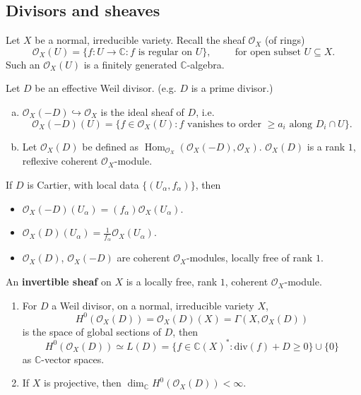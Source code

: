 \documentclass[a4paper,12pt]{amsart}
\newcommand{\CC}{\mathbb{C}}
\newcommand{\OO}{\ensuremath{\mathcal{O}}}
\newcommand{\divof}[1]{\mathrm{div}(#1)}
\DeclareMathOperator{\Hom}{Hom}
\begin{document}
\subsection{Divisors and sheaves}
Let $X$ be a normal, irreducible variety. Recall the sheaf $\OO_X$ (of rings)
\begin{equation*}
	\OO_X(U)=\{f:U\to\CC: f \text{ is regular on }U\}, \hspace{1cm}\text{for open subset }U\subseteq X.
\end{equation*}
Such an $\OO_X(U)$ is a finitely generated $\CC$-algebra.
\begin{Def}
	Let $D$ be an effective Weil divisor. (e.g. $D$ is a prime divisor.)
	\begin{enumerate}[(a)]
		\item $\OO_X(-D)\hookrightarrow\OO_X$ is the ideal sheaf of $D$, i.e. 
		\begin{equation*}
			\OO_X(-D)(U)=\{f\in\OO_X(U):f \text{ vanishes to order }\geq a_i \text{ along }D_i\cap U\}.
		\end{equation*}
		\item Let $\OO_X(D)$ be defined as $\Hom_{\OO_X}(\OO_X(-D),\OO_X)$. $\OO_X(D)$ is a rank $1$, reflexive coherent $\OO_X$-module.
	\end{enumerate}
\end{Def}
If $D$ is Cartier, with local data $\{(U_\alpha,f_\alpha)\}$, then
\begin{itemize}
	\item $\OO_X(-D)(U_\alpha)=(f_\alpha)\OO_X(U_\alpha)$.
	\item $\OO_X(D)(U_\alpha)=\frac{1}{f_\alpha}\OO_X(U_\alpha)$.
	\item $\OO_X(D)$, $\OO_X(-D)$ are coherent $\OO_X$-modules, locally free of rank $1$.
\end{itemize}
\begin{Def}
	An \textbf{invertible sheaf} on $X$ is a locally free, rank $1$, coherent $\OO_X$-module.
\end{Def}
\begin{Fact}
	\begin{enumerate}
		\item For $D$ a Weil divisor, on a normal, irreducible variety $X$,
		\begin{equation*}
		H^{0}(\OO_X(D))=\OO_X(D)(X)=\Gamma(X,\OO_X(D))
		\end{equation*}
		is the space of global sections of $D$, then
		\begin{equation*}
		H^{0}(\OO_X(D))\simeq L(D)=\{f\in\CC(X)^{*}:\divof{f}+D\geq 0\}\cup\{0\}
		\end{equation*}
		as $\CC$-vector spaces.
		\item If $X$ is projective, then $\dim_\CC H^{0}(\OO_X(D))<\infty$.
	\end{enumerate}
	
\end{Fact}
\end{document}
